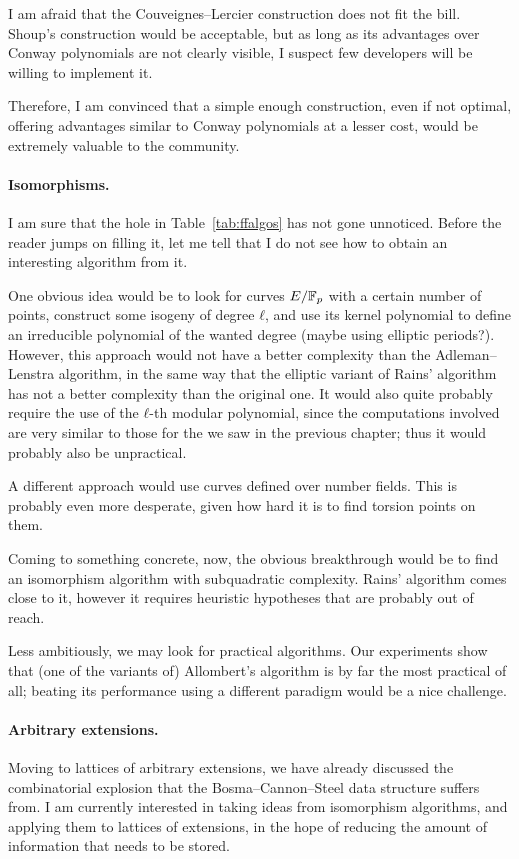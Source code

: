 \documentclass{report}
\theoremstyle{plain}
\theoremstyle{definition}
\begin{document}
I am afraid that the Couveignes--Lercier construction does not fit the
bill. %
Shoup's construction would be acceptable, but as long as its
advantages over Conway polynomials are not clearly visible, I suspect
few developers will be willing to implement it. %

Therefore, I am convinced that a simple enough construction, even if
not optimal, offering advantages similar to Conway polynomials at a
lesser cost, would be extremely valuable to the community. %

\paragraph{Isomorphisms.}
I am sure that the hole in Table~\ref{tab:ffalgos} has not gone
unnoticed. %
Before the reader jumps on filling it, let me tell that I do not see
how to obtain an interesting algorithm from it. %

One obvious idea would be to look for curves $E/\mathbb{F}_p$ with a certain
number of points, construct some isogeny of degree $ℓ$, and use its
kernel polynomial to define an irreducible polynomial of the wanted
degree (maybe using elliptic periods?). %
However, this approach would not have a better complexity than the
Adleman--Lenstra algorithm, in the same way that the elliptic variant
of Rains' algorithm has not a better complexity than the original
one. %
It would also quite probably require the use of the $ℓ$-th modular
polynomial, since the computations involved are very similar to those
for the  we saw in the previous chapter; thus
it would probably also be unpractical. %

A different approach would use curves defined over number fields. %
This is probably even more desperate, given how hard it is to find
torsion points on them. %

Coming to something concrete, now, the obvious breakthrough would be
to find an isomorphism algorithm with subquadratic complexity. %
Rains' algorithm comes close to it, however it requires heuristic
hypotheses that are probably out of reach. %

Less ambitiously, we may look for practical algorithms. %
Our experiments show that (one of the variants of) Allombert's
algorithm is by far the most practical of all; beating its performance
using a different paradigm would be a nice challenge. %


\paragraph{Arbitrary extensions.}
Moving to lattices of arbitrary extensions, we have already discussed
the combinatorial explosion that the Bosma--Cannon--Steel data
structure suffers from. %
I am currently interested in taking ideas from isomorphism algorithms,
and applying them to lattices of extensions, in the hope of reducing
the amount of information that needs to be stored. %
\end{document}
